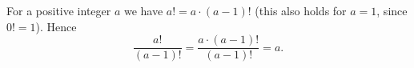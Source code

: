 For a positive integer $a$ we have $a!=a\cdot(a-1)!$ (this also holds for $a=1$, since $0!=1$). Hence
\[
\dfrac{a!}{(a-1)!}=\dfrac{a\cdot(a-1)!}{(a-1)!}=\boxed{a}.
\]
